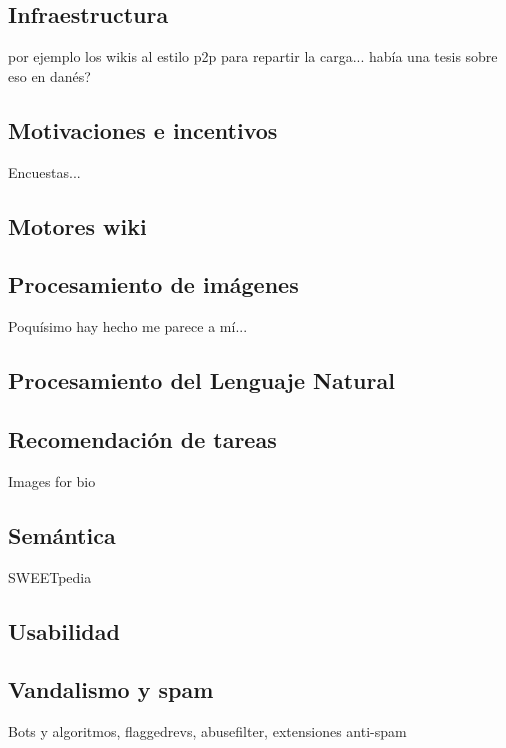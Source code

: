 \documentclass[11pt,onecolumn]{article}
\begin{document}
\subsection{Infraestructura}

por ejemplo los wikis al estilo p2p para repartir la carga... había una tesis sobre eso en danés?


\subsection{Motivaciones e incentivos}


Encuestas...

\subsection{Motores wiki}


\subsection{Procesamiento de imágenes}

Poquísimo hay hecho me parece a mí...

\subsection{Procesamiento del Lenguaje Natural}


\subsection{Recomendación de tareas}

Images for bio

\subsection{Semántica}

SWEETpedia

\subsection{Usabilidad}

\subsection{Vandalismo y spam}

Bots y algoritmos, flaggedrevs, abusefilter, extensiones anti-spam

~\citep{avbot2011}
~\citep{avbot2010}
~\citep{avbot2009}
\end{document}
